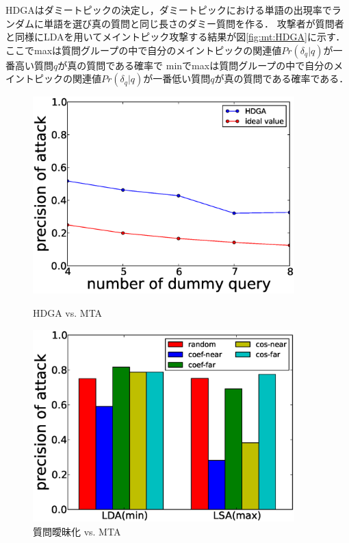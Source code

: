 \documentclass[master]{suribt}
\theoremstyle{definition}
\begin{document}
 HDGAはダミートピックの決定し，ダミートピックにおける単語の出現率でランダムに単語を選び真の質問と同じ長さのダミー質問を作る．
 攻撃者が質問者と同様にLDAを用いてメイントピック攻撃する結果が図\ref{fig:mt:HDGA}に示す．
 ここでmaxは質問グループの中で自分のメイントピックの関連値$Pr(\delta_q|q)$が一番高い質問$q$が真の質問である確率で
 minでmaxは質問グループの中で自分のメイントピックの関連値$Pr(\delta_q|q)$が一番低い質問$q$が真の質問である確率である．
 
 \begin{figure}
 \begin{minipage}[t]{0.5\linewidth}
 \centering
 \includegraphics[width=0.9\textwidth]{HMD.eps}
 \vspace{5em}
 \caption{HDGA vs. MTA}
 \label{fig:mt:HDGA}
 \end{minipage}%
 \begin{minipage}[t]{0.5\linewidth}
 \centering
 \includegraphics[width=0.9\textwidth]{AAAA1.eps}
 \vspace{5em}
 \caption{質問曖昧化 vs. MTA}
 \label{fig:mt:AAAA}
 \end{minipage}
 \end{figure}
\end{document}
